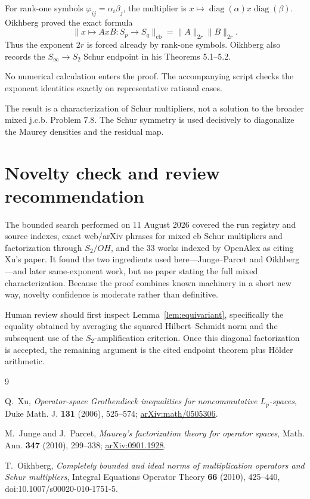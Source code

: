 \documentclass[11pt]{article}
\newcommand{\cb}{\mathrm{cb}}
\newcommand{\diag}{\operatorname{diag}}
\begin{document}
For rank-one symbols $\varphi_{ij}=\alpha_i\beta_j$, the multiplier is
$x\mapsto\diag(\alpha)x\diag(\beta)$.  Oikhberg proved the exact formula
\cite[Theorem 2.1]{Oikhberg}
\[
 \|x\mapsto AxB:S_p\to S_q\|_{\cb}
 =\|A\|_{2r}\|B\|_{2r}.
\]
Thus the exponent $2r$ is forced already by rank-one symbols.  Oikhberg also
records the $S_\infty\to S_2$ Schur endpoint in his Theorems 5.1--5.2.

No numerical calculation enters the proof.  The accompanying script checks
the exponent identities exactly on representative rational cases.

The result is a characterization of Schur multipliers, not a solution to the
broader mixed j.c.b. Problem 7.8.  The Schur symmetry is used decisively to
diagonalize the Maurey densities and the residual map.

\section{Novelty check and review recommendation}

The bounded search performed on 11 August 2026 covered the run registry and
source indexes, exact web/arXiv phrases for mixed cb Schur multipliers and
factorization through $S_2/OH$, and the 33 works indexed by OpenAlex as citing
Xu's paper.  It found the two ingredients used here---Junge--Parcet and
Oikhberg---and later same-exponent work, but no paper stating the full mixed
characterization.  Because the proof combines known machinery in a short new
way, novelty confidence is moderate rather than definitive.

Human review should first inspect Lemma~\ref{lem:equivariant}, specifically
the equality obtained by averaging the squared Hilbert--Schmidt norm and the
subsequent use of the $S_2$-amplification criterion.  Once this diagonal
factorization is accepted, the remaining argument is the cited endpoint
theorem plus H\"older arithmetic.

\begin{thebibliography}{9}

Q.~Xu,
\emph{Operator-space Grothendieck inequalities for noncommutative
$L_p$-spaces},
Duke Math. J. \textbf{131} (2006), 525--574;
\href{https://arxiv.org/abs/math/0505306}{arXiv:math/0505306}.

M.~Junge and J.~Parcet,
\emph{Maurey's factorization theory for operator spaces},
Math. Ann. \textbf{347} (2010), 299--338;
\href{https://arxiv.org/abs/0901.1928}{arXiv:0901.1928}.

T.~Oikhberg,
\emph{Completely bounded and ideal norms of multiplication operators and
Schur multipliers},
Integral Equations Operator Theory \textbf{66} (2010), 425--440,
doi:10.1007/s00020-010-1751-5.

\end{thebibliography}
\end{document}

